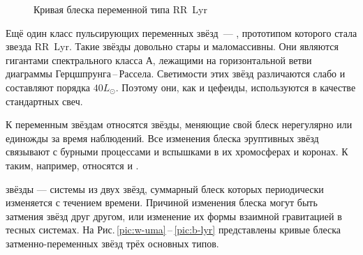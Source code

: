 \begin{wrapfigure}[11]{r}{0.47\tw}
    \centering
    \vspace{-1.2pc}
    \caption{Кривая блеска переменной типа RR~Lyr} %
    \label{pic:light-curve-rr-lyr}
\end{wrapfigure}
Ещё один класс пульсирующих переменных звёзд~--- , прототипом которого стала звезда RR~Lyr. Такие звёзды довольно стары и маломассивны. Они являются гигантами спектрального класса А, лежащими на горизонтальной ветви диаграммы Герцшпрунга\,--\,Рассела. Светимости этих звёзд различаются слабо и составляют порядка $40L_\odot$. Поэтому они, как и цефеиды, используются в качестве стандартных свеч.

К  переменным звёздам относятся звёзды, меняющие свой блеск нерегулярно или единожды за время наблюдений. Все изменения блеска эруптивных звёзд связывают с бурными процессами и вспышками в их хромосферах и коронах. К таким, например, относятся  и .

 звёзды --- системы из двух звёзд, суммарный блеск которых периодически изменяется с течением времени. Причиной изменения блеска могут быть затмения звёзд друг другом, или изменение их формы взаимной гравитацией в тесных системах. На Рис.\,\ref{pic:w-uma}\,--\,\ref{pic:b-lyr}  представлены кривые блеска затменно-переменных звёзд трёх основных типов.


